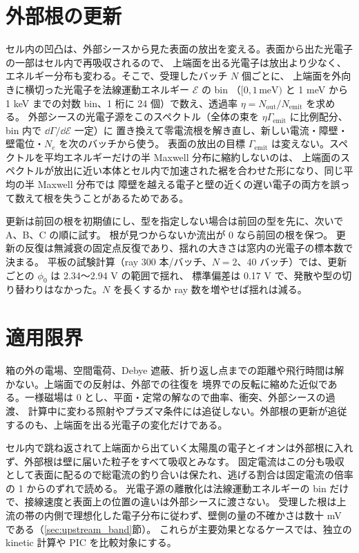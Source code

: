 \section{外部根の更新}
\label{sec:sheath_refresh}
セル内の凹凸は、外部シースから見た表面の放出を変える。表面から出た光電子の一部はセル内で再吸収されるので、
上端面を出る光電子は放出より少なく、エネルギー分布も変わる。そこで、受理したバッチ $N$ 個ごとに、
上端面を外向きに横切った光電子を法線運動エネルギー $\mathcal E$ の bin
（$[0,1\,\mathrm{meV})$ と 1 meV から 1 keV までの対数 bin、1 桁に 24 個）で数え、透過率 $\eta=N_{\mathrm{out}}/N_{\mathrm{emit}}$ を求める。
外部シースの光電子源をこのスペクトル（全体の束を $\eta\Gamma_{\mathrm{emit}}$ に比例配分、bin 内で $\dd\Gamma/\dd\mathcal E$ 一定）に
置き換えて零電流根を解き直し、新しい電流・障壁・壁電位・$N_e$ を次のバッチから使う。
表面の放出の目標 $\Gamma_{\mathrm{emit}}$ は変えない。スペクトルを平均エネルギーだけの半 Maxwell 分布に縮約しないのは、
上端面のスペクトルが放出に近い本体とセル内で加速された裾を合わせた形になり、同じ平均の半 Maxwell 分布では
障壁を越える電子と壁の近くの遅い電子の両方を誤って数えて根を失うことがあるためである。

更新は前回の根を初期値にし、型を指定しない場合は前回の型を先に、次いで A、B、C の順に試す。
根が見つからないか流出が 0 なら前回の根を保つ。
更新の反復は無減衰の固定点反復であり、揺れの大きさは窓内の光電子の標本数で決まる。
平板の試験計算（ray 300 本/バッチ、$N=2$、40 バッチ）では、更新ごとの $\phi_0$ は 2.34〜2.94 V の範囲で揺れ、
標準偏差は 0.17 V で、発散や型の切り替わりはなかった。$N$ を長くするか ray 数を増やせば揺れは減る。

\section{適用限界}
箱の外の電場、空間電荷、Debye 遮蔽、折り返し点までの距離や飛行時間は解かない。上端面での反射は、外部での往復を
境界での反転に縮めた近似である。一様磁場は 0 とし、平面・定常の解なので曲率、衝突、外部シースの過渡、
計算中に変わる照射やプラズマ条件には追従しない。外部根の更新が追従するのも、上端面を出る光電子の変化だけである。

セル内で跳ね返されて上端面から出ていく太陽風の電子とイオンは外部根に入れず、外部根は壁に届いた粒子をすべて吸収とみなす。
固定電流はこの分も吸収として表面に配るので総電流の釣り合いは保たれ、逃げる割合は固定電流の倍率の 1 からのずれで読める。
光電子源の離散化は法線運動エネルギーの bin だけで、接線速度と表面上の位置の違いは外部シースに渡さない。
受理した根は上流の帯の内側で理想化した電子分布に従わず、壁側の量の不確かさは数十 mV である（\ref{sec:upstream_band}節）。
これらが主要効果となるケースでは、独立の kinetic 計算や PIC を比較対象にする。
